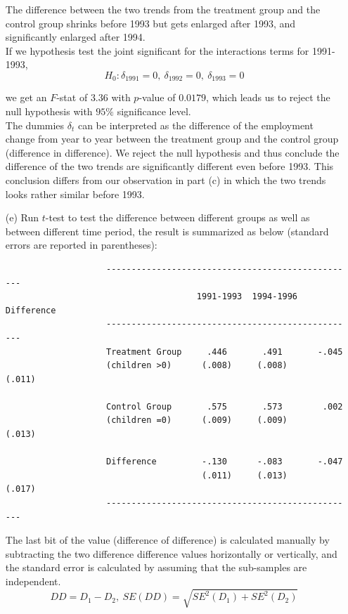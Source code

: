 \documentclass{article}
\begin{document}
\begin{enumerate}
The difference between the two trends from the treatment group and the control group
shrinks before 1993 but gets enlarged after 1993, and significantly enlarged after 1994. \\

If we hypothesis test the joint significant for the interactions terms for 1991-1993, 
$$ H_0: \delta_{1991}=0,\ \delta_{1992}=0,\ \delta_{1993}=0 $$

we get an $F$-stat of $3.36$ with $p$-value of $0.0179$, which leads us to reject the null
hypothesis with $95\%$ significance level. \\

The dummies $\delta_t$ can be interpreted as the difference of the employment change from 
year to year between the treatment group and the control group (difference in difference). 
We reject the null hypothesis and thus conclude the difference of the two trends are 
significantly different even before 1993. This conclusion differs from our observation in 
part (c) in which the two trends looks rather similar before 1993. \\

\newpage

\item[(e)] Run $t$-test to test the difference between different groups as well as between
different time period, the result is summarized as below (standard errors are reported in parentheses): 

                \begin{verbatim}
                    --------------------------------------------------
                                      1991-1993  1994-1996  Difference
                    --------------------------------------------------
                    Treatment Group     .446       .491       -.045
                    (children >0)      (.008)     (.008)      (.011)
                                       
                    Control Group       .575       .573        .002
                    (children =0)      (.009)     (.009)      (.013)
                                       
                    Difference         -.130      -.083       -.047
                                       (.011)     (.013)      (.017)
                    --------------------------------------------------
                \end{verbatim}

The last bit of the value (difference of difference) is calculated manually by subtracting
the two difference difference values horizontally or vertically, and the standard error 
is calculated by assuming that the sub-samples are independent.
$$ DD = D_1 - D_2,\ SE(DD) = \sqrt{SE^2(D_1) + SE^2(D_2)} $$


\end{enumerate}
\end{document}

